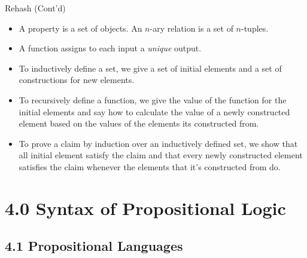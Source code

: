 \begin{frame}{Rehash (Cont'd)}
	
\begin{itemize}
			
		\item A property is a set of objects. An $n$-ary relation is a set of $n$-tuples.
		
		\item A function assigns to each input a \emph{unique} output.
		
		\item \alert{To inductively define a set, we give a set of initial elements and a set of constructions for new elements.}
		
		\item \alert{To recursively define a function, we give the value of the function for the initial elements and say how to calculate the value of a newly constructed element based on the values of the elements its constructed from.}
		
		\item \alert{To prove a claim by induction over an inductively defined set, we show that all initial element satisfy the claim and that every newly constructed element satisfies the claim whenever the elements that it's constructed from do.}
			

	\end{itemize}

\end{frame}

\section{4.0 Syntax of Propositional Logic}
\subsection{4.1 Propositional Languages}

